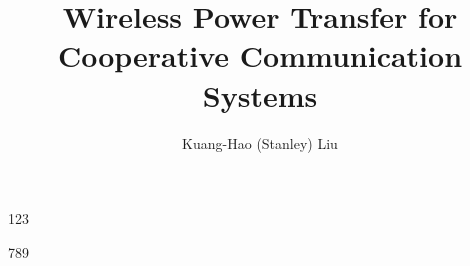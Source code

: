 \documentclass[12pt]{article}%
\begin{document}
\title{Wireless Power Transfer for Cooperative Communication Systems}
\date{}
\author{Kuang-Hao (Stanley) Liu}
\maketitle

123

789
\end{document}
